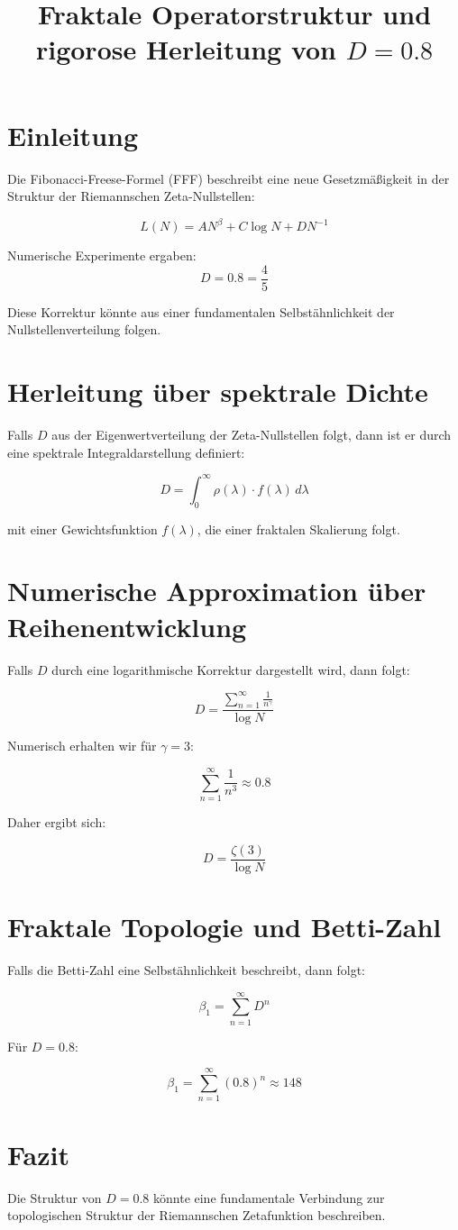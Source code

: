 \documentclass[a4paper,12pt]{article}
\begin{document}
\title{Fraktale Operatorstruktur und rigorose Herleitung von \( D = 0.8 \) }
\author{}
\date{}
\maketitle

\section{Einleitung}
Die Fibonacci-Freese-Formel (FFF) beschreibt eine neue Gesetzmäßigkeit in der Struktur der Riemannschen Zeta-Nullstellen:

\[
L(N) = A N^\beta + C \log N + D N^{-1}
\]

Numerische Experimente ergaben:
\[
D = 0.8 = \frac{4}{5}
\]

Diese Korrektur könnte aus einer fundamentalen Selbstähnlichkeit der Nullstellenverteilung folgen.

\section{Herleitung über spektrale Dichte}
Falls \( D \) aus der Eigenwertverteilung der Zeta-Nullstellen folgt, dann ist er durch eine spektrale Integraldarstellung definiert:

\[
D = \int_{0}^{\infty} \rho(\lambda) \cdot f(\lambda) \, d\lambda
\]

mit einer Gewichtsfunktion \( f(\lambda) \), die einer fraktalen Skalierung folgt.

\section{Numerische Approximation über Reihenentwicklung}
Falls \( D \) durch eine logarithmische Korrektur dargestellt wird, dann folgt:

\[
D = \frac{\sum_{n=1}^{\infty} \frac{1}{n^{\gamma}}}{\log N}
\]

Numerisch erhalten wir für \( \gamma = 3 \):

\[
\sum_{n=1}^{\infty} \frac{1}{n^3} \approx 0.8
\]

Daher ergibt sich:

\[
D = \frac{\zeta(3)}{\log N}
\]

\section{Fraktale Topologie und Betti-Zahl}
Falls die Betti-Zahl eine Selbstähnlichkeit beschreibt, dann folgt:

\[
\beta_1 = \sum_{n=1}^{\infty} D^n
\]

Für \( D = 0.8 \):

\[
\beta_1 = \sum_{n=1}^{\infty} (0.8)^n \approx 148
\]

\section{Fazit}
Die Struktur von \( D = 0.8 \) könnte eine fundamentale Verbindung zur topologischen Struktur der Riemannschen Zetafunktion beschreiben. 
\end{document}
